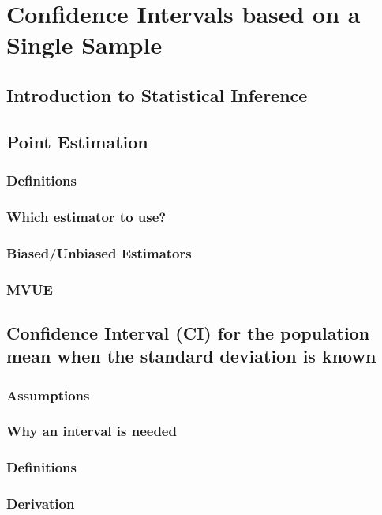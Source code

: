 \chapter{Confidence Intervals based on a Single Sample}  %

\section{Introduction to Statistical Inference}  %

\section{Point Estimation}  %
\subsection{Definitions}  %
\subsection{Which estimator to use?}  %
\subsection{Biased/Unbiased Estimators}  %
\subsection{MVUE}  %

\section{Confidence Interval (CI) for the population mean when the standard deviation is known}  %
\subsection{Assumptions}  %
\subsection{Why an interval is needed}  %
\subsection{Definitions}  %
\subsection{Derivation}  %
